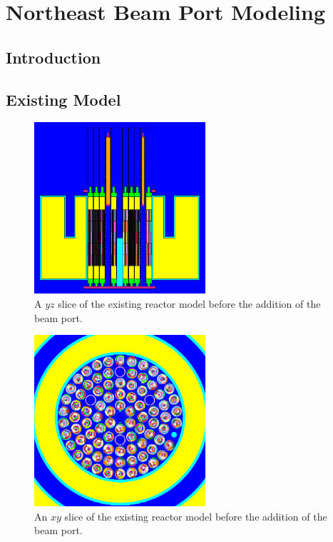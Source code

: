 
\cleardoublepage


\chapter{Northeast Beam Port Modeling}


\section{Introduction}

\section{Existing Model}


\begin{figure}[htb]
\centering
\includegraphics[height=2.5in]{tex/figures/existingyz.png}
\caption[Old Reactor Model $YZ$]{A $yz$ slice of the existing reactor model before the addition of the beam port.}
\label{figure1}
\end{figure}

\begin{figure}[htb]
\centering
\includegraphics[height=2.5in]{tex/figures/existingxy.png}
\caption[Old Reactor Model $XY$]{An $xy$ slice of the existing reactor model before the addition of the beam port.}
\label{figure1}
\end{figure}





